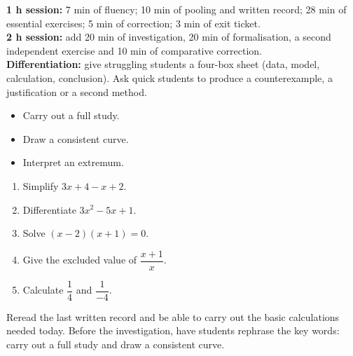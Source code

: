 \ifmxteacher
\begin{method}
\textbf{1 h session:} 7 min of fluency; 10 min of pooling and written record; 28 min of essential exercises; 5 min of correction; 3 min of exit ticket.\\
\textbf{2 h session:} add 20 min of investigation, 20 min of formalisation, a second independent exercise and 10 min of comparative correction.\\
\textbf{Differentiation:} give struggling students a four-box sheet (data, model, calculation, conclusion). Ask quick students to produce a counterexample, a justification or a second method.
\end{method}
\fi
{}
\begin{objectives}\begin{itemize}\item Carry out a full study.\item Draw a consistent curve.\item Interpret an extremum.\end{itemize}\end{objectives}
\begin{fluency}\begin{enumerate}\item Simplify $3x+4-x+2$. \item Differentiate $3x^2-5x+1$. \item Solve $(x-2)(x+1)=0$. \item Give the excluded value of $\dfrac{x+1}{x}$. \item Calculate $\dfrac1{4}$ and $\dfrac1{-4}$. \end{enumerate}\end{fluency}
\begin{prerequisites}Reread the last written record and be able to carry out the basic calculations needed today. Before the investigation, have students rephrase the key words: carry out a full study and draw a consistent curve.\end{prerequisites}

